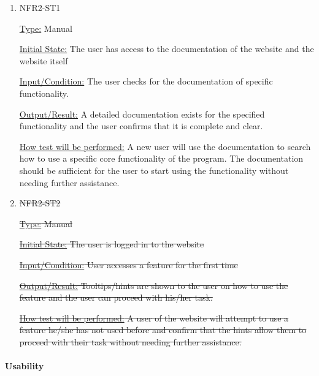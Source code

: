 \documentclass[12pt, titlepage]{article}
\begin{document}
\begin{enumerate}

\item{NFR2-ST1\\}

\underline{Type:} Manual

\underline{Initial State:} The user has access to the documentation of the website and the website itself

\underline{Input/Condition:} The user checks for the documentation of specific functionality.

\underline{Output/Result:} A detailed documentation exists for the specified functionality and the user confirms that it is complete and clear.

\underline{How test will be performed:} 
A new user will use the documentation to search how to use a specific core functionality of the program. The documentation should be sufficient for the user to start using the functionality without needing further assistance.

\item{\sout{NFR2-ST2\\}}


\sout{\underline{Type:} Manual}

\sout{\underline{Initial State:} The user is logged in to the website}

\sout{\underline{Input/Condition:} User accesses a feature for the first time}

\sout{\underline{Output/Result:} Tooltips/hints are shown to the user on how to use the feature and the user can proceed with his/her task.}

\sout{\underline{How test will be performed:} 
A user of the website will attempt to use a feature he/she has not used before and confirm that the hints allow them to proceed with their task without needing further assistance.}

\end{enumerate}

\paragraph{Usability }
\end{document}

